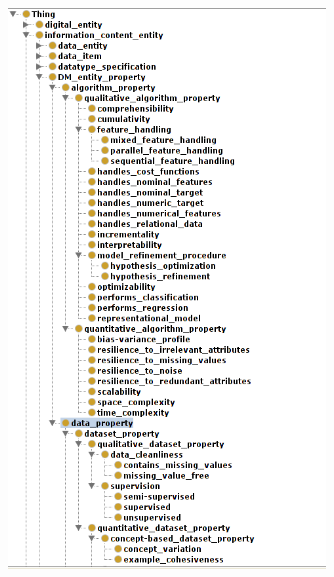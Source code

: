 \documentclass[a4paper,12pt, english]{article}
\begin{document}
\begin{figure}[h]   
  \centering 
  \includegraphics[width=0.75\textwidth]{figs/expose2-1}
  \caption{}
  \label{fig:expose2-1}
\end{figure}
\end{document}
